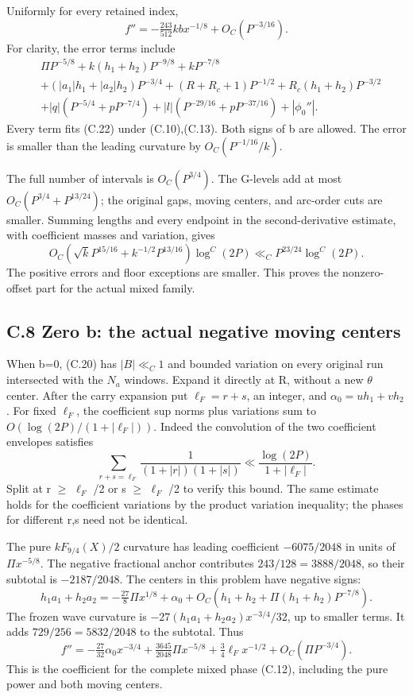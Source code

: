 \documentclass[11pt,a4paper]{article}
\begin{document}
Uniformly for every retained index, \[
f''=-\tfrac{243}{512}kb x^{-1/8}+O_C(P^{-3/16}). \tag{C.22}
\] For clarity, the error terms include \[
\begin{split}
&\Pi P^{-5/8}+k(h_1+h_2)P^{-9/8}+kP^{-7/8}\\
&+(|a_1|h_1+|a_2|h_2)P^{-3/4}
+(R+R_c+1)P^{-1/2}+R_c(h_1+h_2)P^{-3/2}\\
&+|q|(P^{-5/4}+pP^{-7/4})
+|l|(P^{-29/16}+pP^{-37/16})+|\phi_0''|.
\end{split}
\] Every term fits (C.22) under (C.10),(C.13). Both signs of b are
allowed. The error is smaller than the leading curvature by
\(O_C(P^{-1/16}/k)\).

The full number of intervals is \(O_C(P^{3/4})\). The G-levels add at
most \(O_C(P^{3/4}+P^{13/24})\); the original gaps, moving centers, and
arc-order cuts are smaller. Summing lengths and every endpoint in the
second-derivative estimate, with coefficient masses and variation, gives
\[
O_C\left(\sqrt{k}P^{15/16}
+k^{-1/2}P^{13/16}\right)\log^C(2P)
\ll_C P^{23/24}\log^C(2P). \tag{C.23}
\] The positive errors and floor exceptions are smaller. This proves the
nonzero-offset part for the actual mixed family.

\subsection{C.8 Zero b: the actual negative moving
centers}\label{c.8-zero-b-the-actual-negative-moving-centers}

When b=0, (C.20) has \(|B|\ll_C1\) and bounded variation on every
original run intersected with the \(N_a\) windows. Expand it directly at
R, without a new \(\theta\) center. After the carry expansion put
\(\ell_F=r+s\), an integer, and \(\alpha_0=uh_1+vh_2\). For fixed
\(\ell_F\), the coefficient sup norms plus variations sum to
\(O(\log(2P)/(1+|\ell_F|))\). Indeed the convolution of the two
coefficient envelopes satisfies \[
\sum_{r+s=\ell_F}\frac1{(1+|r|)(1+|s|)}
\ll\frac{\log(2P)}{1+|\ell_F|}.
\] Split at \textbar r\textbar{} \(\ge\) \textbar{} \(\ell_F\)
\textbar/2 or \textbar s\textbar{} \(\ge\) \textbar{} \(\ell_F\)
\textbar/2 to verify this bound. The same estimate holds for the
coefficient variations by the product variation inequality; the phases
for different r,s need not be identical.

The pure \(kF_{9/4}(X)/2\) curvature has leading coefficient
\(-6075/2048\) in units of \(\Pi x^{-5/8}\). The negative fractional
anchor contributes \(243/128=3888/2048\), so their subtotal is
\(-2187/2048\). The centers in this problem have negative signs: \[
h_1a_1+h_2a_2
=-\tfrac{27}{8}\Pi x^{1/8}+\alpha_0
+O_C(h_1+h_2+\Pi(h_1+h_2)P^{-7/8}). \tag{C.24}
\] The frozen wave curvature is \(-27(h_1a_1+h_2a_2)x^{-3/4}/32\), up to
smaller terms. It adds \(729/256=5832/2048\) to the subtotal. Thus \[
f''=-\tfrac{27}{32}\alpha_0x^{-3/4}
+\tfrac{3645}{2048}\Pi x^{-5/8}
+\tfrac34\ell_Fx^{-1/2}
+O_C(\Pi P^{-3/4}). \tag{C.25}
\] This is the coefficient for the complete mixed phase (C.12),
including the pure power and both moving centers.
\end{document}
